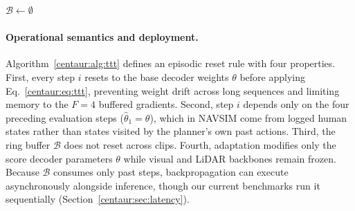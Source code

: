 \begin{algorithm}[t]
  \DontPrintSemicolon
  \caption{Test-time training in Centaur}\label{centaur:alg:ttt}
  $\mathcal{B} \leftarrow \emptyset$ 
\end{algorithm}

\paragraph{Operational semantics and deployment.} Algorithm~\ref{centaur:alg:ttt} defines an episodic reset rule with four properties. First, every step $i$ resets to the base decoder weights $\theta$ before applying Eq.~\eqref{centaur:eq:ttt}, preventing weight drift across long sequences and limiting memory to the $F=4$ buffered gradients. Second, step $i$ depends only on the four preceding evaluation steps ($\hat{\theta}_1 = \theta$), which in NAVSIM come from logged human states rather than states visited by the planner's own past actions. Third, the ring buffer $\mathcal{B}$ does not reset across clips. Fourth, adaptation modifies only the score decoder parameters $\theta$ while visual and LiDAR backbones remain frozen. Because $\mathcal{B}$ consumes only past steps, backpropagation can execute asynchronously alongside inference, though our current benchmarks run it sequentially (Section~\ref{centaur:sec:latency}).

